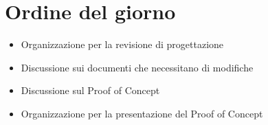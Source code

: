 \section{Ordine del giorno}
\begin{itemize}
\item Organizzazione per la revisione di progettazione
\item Discussione sui documenti che necessitano di modifiche
\item Discussione sul Proof of Concept
\item Organizzazione per la presentazione del Proof of Concept
\end{itemize}